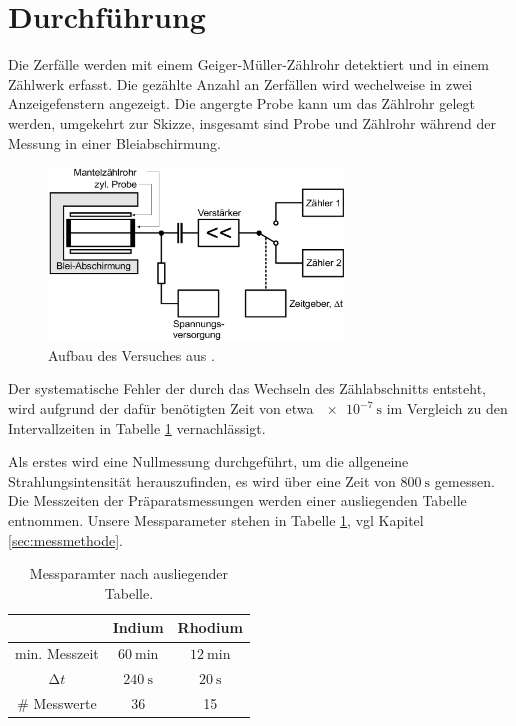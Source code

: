 \section{Durchführung}
\label{sec:durchfuehrung}
Die Zerfälle werden mit einem Geiger-Müller-Zählrohr detektiert und in einem
Zählwerk erfasst.
Die gezählte Anzahl an Zerfällen wird wechelweise in zwei Anzeigefenstern angezeigt.
Die angergte Probe kann um das Zählrohr gelegt werden, umgekehrt zur Skizze,
insgesamt sind Probe und Zählrohr während der Messung in einer Bleiabschirmung.

\begin{figure}
      \centering
      \includegraphics[width=0.7\textwidth]{content/schematischer-aufbau.png}
      \caption{Aufbau des Versuches aus \cite{Anleitung}.}
      \label{fig:aufbau}
\end{figure}

Der systematische Fehler der durch das Wechseln des Zählabschnitts entsteht,
wird aufgrund der dafür benötigten Zeit von etwa $\SI{e-7}{\second}$ im Vergleich
zu den Intervallzeiten in Tabelle \ref{tab:messparameter} vernachlässigt.

Als erstes wird eine Nullmessung durchgeführt, um die allgeneine
Strahlungsintensität herauszufinden, es wird über eine Zeit von
$\SI{800}{\second}$ gemessen.\\
Die Messzeiten der Präparatsmessungen werden einer ausliegenden Tabelle
entnommen. Unsere Messparameter stehen in Tabelle \ref{tab:messparameter},
vgl Kapitel \ref{sec:messmethode}.

\begin{table}
    \centering
    \caption{Messparamter nach ausliegender Tabelle.}
    \label{tab:messparameter}
    \begin{tabular}{c c c}
        \toprule
        & {Indium} & {Rhodium} \\
        \midrule
        {min. Messzeit} & $\SI{60}{\minute}$ & $\SI{12}{\minute}$ \\
        $\increment t$ & $\SI{240}{\second}$ & $\SI{20}{\second}$ \\
        {\# Messwerte} & 36 & 15 \\
        \bottomrule
    \end{tabular}
\end{table}
